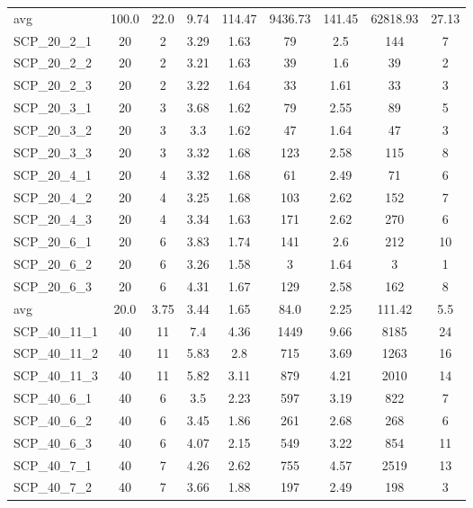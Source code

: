 \begin{table}[!ht]
{\begin{tabular}{lcccccccc}
\cline{1-9} avg & 100.0 & 22.0 & 9.74 & 114.47& 9436.73 & 141.45& 62818.93 & 27.13\\ \cline{1-9}
SCP\_20\_2\_1 & 20 & 2 & 3.29 &  \textcolor{blue2}{1.63} & 79 & 2.5 & 144 & 7 \\
SCP\_20\_2\_2 & 20 & 2 & 3.21 & 1.63 & 39 &  \textcolor{blue2}{1.6} & 39 & 2 \\
SCP\_20\_2\_3 & 20 & 2 & 3.22 & 1.64 & 33 &  \textcolor{blue2}{1.61} & 33 & 3 \\
SCP\_20\_3\_1 & 20 & 3 & 3.68 &  \textcolor{blue2}{1.62} & 79 & 2.55 & 89 & 5 \\
SCP\_20\_3\_2 & 20 & 3 & 3.3 &  \textcolor{blue2}{1.62} & 47 & 1.64 & 47 & 3 \\
SCP\_20\_3\_3 & 20 & 3 & 3.32 &  \textcolor{blue2}{1.68} & 123 & 2.58 & 115 & 8 \\
SCP\_20\_4\_1 & 20 & 4 & 3.32 &  \textcolor{blue2}{1.68} & 61 & 2.49 & 71 & 6 \\
SCP\_20\_4\_2 & 20 & 4 & 3.25 &  \textcolor{blue2}{1.68} & 103 & 2.62 & 152 & 7 \\
SCP\_20\_4\_3 & 20 & 4 & 3.34 &  \textcolor{blue2}{1.63} & 171 & 2.62 & 270 & 6 \\
SCP\_20\_6\_1 & 20 & 6 & 3.83 &  \textcolor{blue2}{1.74} & 141 & 2.6 & 212 & 10 \\
SCP\_20\_6\_2 & 20 & 6 & 3.26 &  \textcolor{blue2}{1.58} & 3 & 1.64 & 3 & 1 \\
SCP\_20\_6\_3 & 20 & 6 & 4.31 &  \textcolor{blue2}{1.67} & 129 & 2.58 & 162 & 8 \\
\cline{1-9} avg & 20.0 & 3.75 & 3.44 & 1.65& 84.0 & 2.25& 111.42 & 5.5\\ \cline{1-9}
SCP\_40\_11\_1 & 40 & 11 & 7.4 &  \textcolor{blue2}{4.36} & 1449 & 9.66 & 8185 & 24 \\
SCP\_40\_11\_2 & 40 & 11 & 5.83 &  \textcolor{blue2}{2.8} & 715 & 3.69 & 1263 & 16 \\
SCP\_40\_11\_3 & 40 & 11 & 5.82 &  \textcolor{blue2}{3.11} & 879 & 4.21 & 2010 & 14 \\
SCP\_40\_6\_1 & 40 & 6 & 3.5 &  \textcolor{blue2}{2.23} & 597 & 3.19 & 822 & 7 \\
SCP\_40\_6\_2 & 40 & 6 & 3.45 &  \textcolor{blue2}{1.86} & 261 & 2.68 & 268 & 6 \\
SCP\_40\_6\_3 & 40 & 6 & 4.07 &  \textcolor{blue2}{2.15} & 549 & 3.22 & 854 & 11 \\
SCP\_40\_7\_1 & 40 & 7 & 4.26 &  \textcolor{blue2}{2.62} & 755 & 4.57 & 2519 & 13 \\
SCP\_40\_7\_2 & 40 & 7 & 3.66 &  \textcolor{blue2}{1.88} & 197 & 2.49 & 198 & 3 \\

\end{tabular}}
\end{table}
